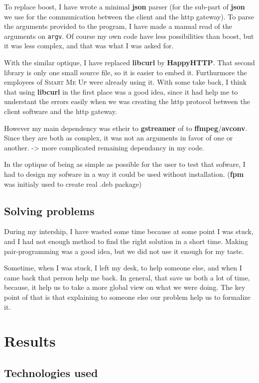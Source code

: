\documentclass[a4paper,11pt]{custom}
\newcommand{\smu}{\textsc{Smart Me Up}}
\newcommand{\avconv}{\textbf{avconv}}
\newcommand{\ffmpeg}{\textbf{ffmpeg}}
\newcommand{\gstreamer}{\textbf{gstreamer}}
\newcommand{\happyhttp}{\textbf{HappyHTTP}}
\newcommand{\libcurl}{\textbf{libcurl}}
\newcommand{\fpm}{\textbf{fpm}}
\newcommand{\json}{\textbf{json}}
\begin{document}
To replace boost, I have wrote a minimal \json{} parser (for the sub-part of
\json{} we use for the communication between the client and the http gateway).
To parse the arguments provided to the program, I have made a manual read of
the arguments on \verb+argv+. Of course my own code have less possibilities than
boost, but it was less complex, and that was what I was asked for.

With the similar optique, I have replaced \libcurl{} by \happyhttp. That second
library is only one small source file, so it is easier to embed it. Furthurmore
the employees of \smu{} were already using it. With some take back, I think that
using \libcurl{} in the first place was a good idea, since it had help me to
understant the errors easily when we was creating the http protocol between the
client software and the http gateway.

However my main dependency was etheir to \gstreamer{} of to \ffmpeg/\avconv. Since
they are both as complex, it was not an arguments in favor of one or another.
-> more complicated remaining dependancy in my code.

In the optique of being as simple as possible for the user to test that sofware,
I had to design my sofware in a way it could be used without installation.
(\fpm{} was initialy used to create real .deb package)

\section{Solving problems}

During my intership, I have wasted some time because at some point I was stuck,
and I had not enough method to find the right solution in a short time. Making
pair-programming was a good idea, but we did not use it enough for my taste.

Sometime, when I was stuck, I left my desk, to help someone else, and when I
came back that person help me back. In general, that save us both a lot of time,
because, it help us to take a more global view on what we were doing. The key
point of that is that explaining to someone else our problem help us to
formalize it.

\chapter{Results}

\section{Technologies used}
\end{document}
